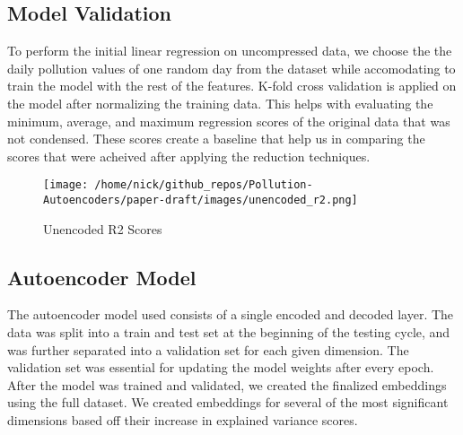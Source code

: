 \documentclass{article}
\begin{document}
\subsection{Model Validation}

\par To perform the initial linear regression on uncompressed data, we choose the the daily pollution values of one random day from the dataset while accomodating to train the model with the rest of the features. K-fold cross validation is applied on the model after normalizing the training data. This helps with evaluating the minimum, average, and maximum regression scores of the original data that was not condensed. These scores create a baseline that help us in comparing the scores that were acheived after applying the reduction techniques.

\begin{figure}[h!]
    \centering
    \caption{Unencoded R2 Scores}
    \label{fig:pipeline}
    \texttt{[image: /home/nick/github\_repos/Pollution-Autoencoders/paper-draft/images/unencoded\_r2.png]}
\end{figure}

\subsection{Autoencoder Model}

\par The autoencoder model used consists of a single encoded and decoded layer. The data was split into a train and test set at the beginning of the testing cycle, and was further separated into a validation set for each given dimension. The validation set was essential for updating the model weights after every epoch. After the model was trained and validated, we created the finalized embeddings using the full dataset. We created embeddings for several of the most significant dimensions based off their increase in explained variance scores.
\end{document}
